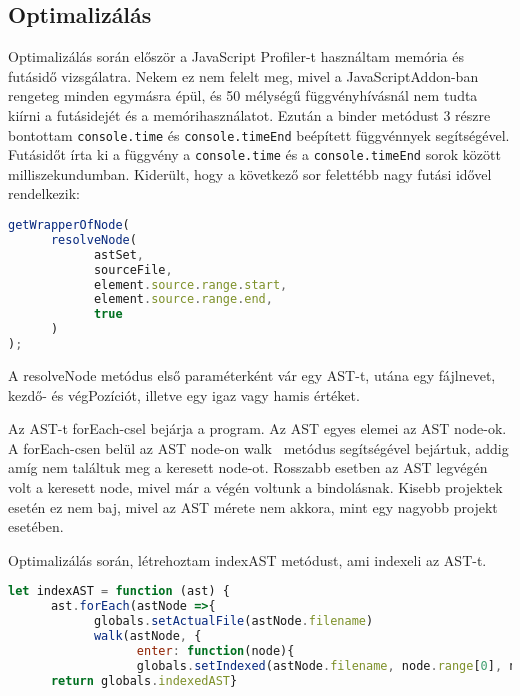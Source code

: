 \subsection{Optimalizálás}

\noindent

Optimalizálás során először a JavaScript Profiler-t használtam memória és futásidő vizsgálatra.
Nekem ez nem felelt meg, mivel a JavaScriptAddon-ban rengeteg minden egymásra épül, és 50 mélységű függvényhívásnál nem tudta kiírni a futásidejét és a memórihasználatot.
Ezután a binder metódust 3 részre bontottam \texttt{console.time} és \texttt{console.timeEnd} beépített függvénnyek segítségével.
Futásidőt írta ki a függvény a \texttt{console.time} és a \texttt{console.timeEnd} sorok között milliszekundumban.
Kiderült, hogy a következő sor felettébb nagy futási idővel rendelkezik:

\begin{lstlisting}[caption={Lassú metódus}, label={lst:binder_problemas_function}, language={JavaScript}]
getWrapperOfNode(
      resolveNode(
            astSet,
            sourceFile,
            element.source.range.start,
            element.source.range.end,
            true
      )
);
\end{lstlisting}

A resolveNode metódus első paraméterként vár egy AST-t, utána egy fájlnevet, kezdő- és végPozíciót, illetve egy igaz vagy hamis értéket.

Az AST-t forEach-csel bejárja a program. Az AST egyes elemei az AST node-ok.
A forEach-csen belül az AST node-on walk~\cite{porter2006abstract}  metódus segítségével bejártuk, addig amíg nem találtuk meg a keresett node-ot.
Rosszabb esetben az AST legvégén volt a keresett node, mivel már a végén voltunk a bindolásnak.
Kisebb projektek esetén ez nem baj, mivel az AST mérete nem akkora, mint egy nagyobb projekt esetében.

\noindent

Optimalizálás során, létrehoztam indexAST metódust, ami indexeli az AST-t.

\begin{lstlisting}[caption={indexAST metódus}, label={lst:indexAST_function}, language={JavaScript}]
let indexAST = function (ast) {
      ast.forEach(astNode =>{
            globals.setActualFile(astNode.filename)
            walk(astNode, {
                  enter: function(node){
                  globals.setIndexed(astNode.filename, node.range[0], node.range[1], node)}})})
      return globals.indexedAST}
\end{lstlisting}

